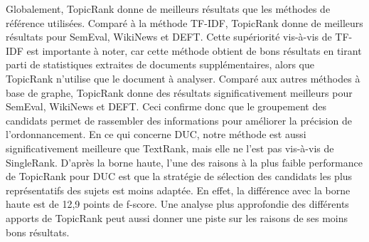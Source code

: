     Globalement, TopicRank donne de meilleurs résultats que les méthodes de
    référence utilisées.
    Comparé à la méthode TF-IDF, TopicRank donne de meilleurs résultats pour
    SemEval, WikiNews et DEFT. Cette supériorité vis-à-vis de TF-IDF est
    importante à noter, car cette méthode obtient de bons résultats en tirant
    parti de statistiques extraites de documents supplémentaires, alors que
    TopicRank n'utilise que le document à analyser. Comparé aux autres méthodes
    à base de graphe, TopicRank donne des résultats significativement meilleurs
    pour SemEval, WikiNews et DEFT. Ceci confirme donc que le groupement des
    candidats permet de rassembler des informations pour améliorer la précision
    de l'ordonnancement. En ce qui concerne DUC, notre méthode est aussi
    significativement meilleure que TextRank, mais elle ne l'est pas vis-à-vis
    de SingleRank. D'après la borne haute, l'une des raisons à la plus faible
    performance de TopicRank pour DUC est que la stratégie de sélection des
    candidats les plus représentatifs des sujets est moins adaptée. En effet, la
    différence avec la borne haute est de 12,9 points de f-score. Une analyse
    plus approfondie des différents apports de TopicRank peut aussi donner une
    piste sur les raisons de ses moins bons résultats.
